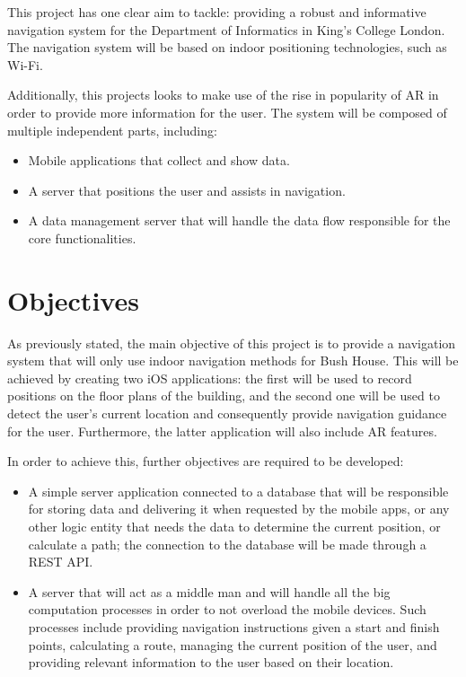 This project has one clear aim to tackle: providing a robust and informative navigation system for the Department of Informatics in King's College London. The navigation system will be based on indoor positioning technologies, such as Wi-Fi.

Additionally, this projects looks to make use of the rise in popularity of AR in order to provide more information for the user. The system will be composed of multiple independent parts, including:
\begin{itemize}
    \item Mobile applications that collect and show data.
    \item A server that positions the user and assists in navigation.
    \item A data management server that will handle the data flow responsible for the core functionalities.
\end{itemize}

\section{Objectives}
\label{sec:objectives}

As previously stated, the main objective of this project is to provide a navigation system that will only use indoor navigation methods for Bush House. This will be achieved by creating two iOS applications: the first will be used to record positions on the floor plans of the building, and the second one will be used to detect the user's current location and consequently provide navigation guidance for the user. Furthermore, the latter application will also include AR features.

In order to achieve this, further objectives are required to be developed:
\begin{itemize}
    \item A simple server application connected to a database that will be responsible for storing data and delivering it when requested by the mobile apps, or any other logic entity that needs the data to determine the current position, or calculate a path; the connection to the database will be made through a REST API.
    \item A server that will act as a middle man and will handle all the big computation processes in order to not overload the mobile devices. Such processes include providing navigation instructions given a start and finish points, calculating a route, managing the current position of the user, and providing relevant information to the user based on their location.
\end{itemize}
